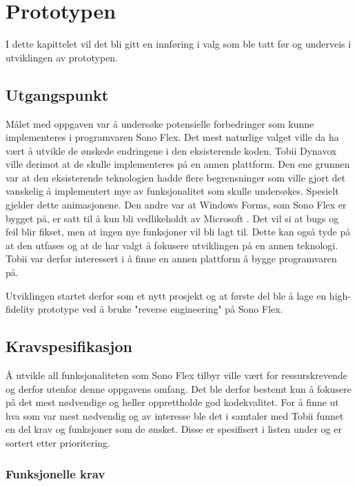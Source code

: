 \chapter{Prototypen} 

I dette kapittelet vil det bli gitt en innføring i valg som ble tatt før og underveis i utviklingen av prototypen. 
 
\section{Utgangspunkt} 
\label{sec:utgangspunkt} 

Målet med oppgaven var å undersøke potensielle forbedringer som kunne implementeres i programvaren Sono Flex. Det mest naturlige valget ville da  ha vært å utvikle de ønskede endringene i den eksisterende koden. Tobii Dynavox ville derimot at de skulle implementeres på en annen plattform. Den ene grunnen var at den eksisterende teknologien hadde flere begrensninger som ville gjort det vanskelig å implementert mye av funksjonalitet som skulle undersøkes. Spesielt gjelder dette animasjonene. Den andre var at Windows Forms, som Sono Flex er bygget på,  er satt til å kun bli vedlikeholdt av Microsoft  \cite{AAAWPF8:online}.  Det vil si at bugs og feil blir fikset, men at ingen nye funksjoner vil bli lagt til. Dette kan også tyde på at den utfases og at de har valgt å fokusere utviklingen på en annen teknologi. Tobii var derfor interessert i å finne en annen plattform å bygge programvaren på.

Utviklingen startet derfor som et nytt prosjekt og at første del ble å lage en high-fidelity prototype ved å bruke "reverse engineering" på Sono Flex.  




\section{Kravspesifikasjon} 


Å utvikle all funksjonaliteten som Sono Flex tilbyr ville vært for ressurskrevende og derfor utenfor denne oppgavens omfang. Det ble derfor bestemt kun å fokusere på det mest nødvendige og heller opprettholde god kodekvalitet. For å finne ut hva som var mest nødvendig og av interesse ble det i samtaler med Tobii funnet en del krav og funksjoner som de ønsket. Disse er spesifisert i listen under og er sortert etter prioritering. 
 
\subsection{Funksjonelle krav} 
 
